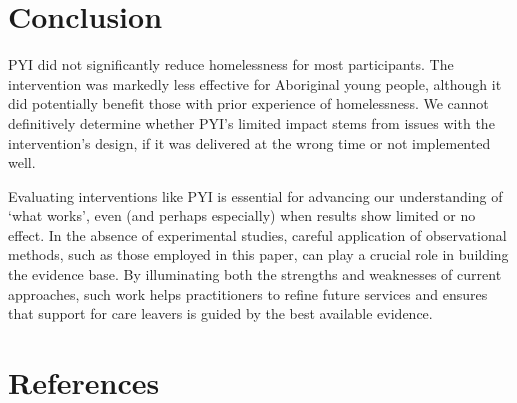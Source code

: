 \documentclass[
  jou,
  floatsintext,
  longtable,
  nolmodern,
  notxfonts,
  notimes,
  colorlinks=true,linkcolor=blue,citecolor=blue,urlcolor=blue]{apa7}
\begin{document}
\section{Conclusion}\label{conclusion}

PYI did not significantly reduce homelessness for most participants. The
intervention was markedly less effective for Aboriginal young people,
although it did potentially benefit those with prior experience of
homelessness. We cannot definitively determine whether PYI's limited
impact stems from issues with the intervention's design, if it was
delivered at the wrong time or not implemented well.

Evaluating interventions like PYI is essential for advancing our
understanding of `what works', even (and perhaps especially) when
results show limited or no effect. In the absence of experimental
studies, careful application of observational methods, such as those
employed in this paper, can play a crucial role in building the evidence
base. By illuminating both the strengths and weaknesses of current
approaches, such work helps practitioners to refine future services and
ensures that support for care leavers is guided by the best available
evidence.

\section{References}\label{references}
\end{document}
